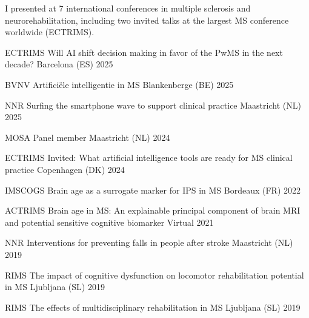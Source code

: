 
I presented at 7 international conferences in multiple sclerosis and neurorehabilitation, including two invited talks at the largest MS conference worldwide (ECTRIMS).

\begin{cvpresentations}

  \cvhonor
    {ECTRIMS} %
    {Will AI shift decision making in favor of the PwMS in the next decade?} %
    {Barcelona (ES)} %
    {2025} %


  \cvhonor
    {BVNV} %
    {Artificiële intelligentie in MS} %
    {Blankenberge (BE)} %
    {2025} %


  \cvhonor
    {NNR} %
    {Surfing the smartphone wave to support clinical practice} %
    {Maastricht (NL)} %
    {2025} %


  \cvhonor
    {MOSA} %
    {Panel member} %
    {Maastricht (NL)} %
    {2024} %


  \cvhonor
    {ECTRIMS} %
    {Invited: What artificial intelligence tools are ready for MS clinical practice} %
    {Copenhagen (DK)} %
    {2024} %


  \cvhonor
    {IMSCOGS} %
    {Brain age as a surrogate marker for IPS in MS} %
    {Bordeaux (FR)} %
    {2022} %


  \cvhonor
    {ACTRIMS} %
    {Brain age in MS: An explainable principal component of brain MRI and potential sensitive cognitive biomarker} %
    {Virtual\vfill} %
    {2021\vfill} %


  \cvhonor
    {NNR} %
    {Interventions for preventing falls in people after stroke} %
    {Maastricht (NL)} %
    {2019} %


  \cvhonor
    {RIMS} %
    {The impact of cognitive dysfunction on locomotor rehabilitation potential in MS} %
    {Ljubljana (SL)} %
    {2019} %


  \cvhonor
    {RIMS} %
    {The effects of multidisciplinary rehabilitation in MS} %
    {Ljubljana (SL)} %
    {2019} %


\end{cvpresentations}